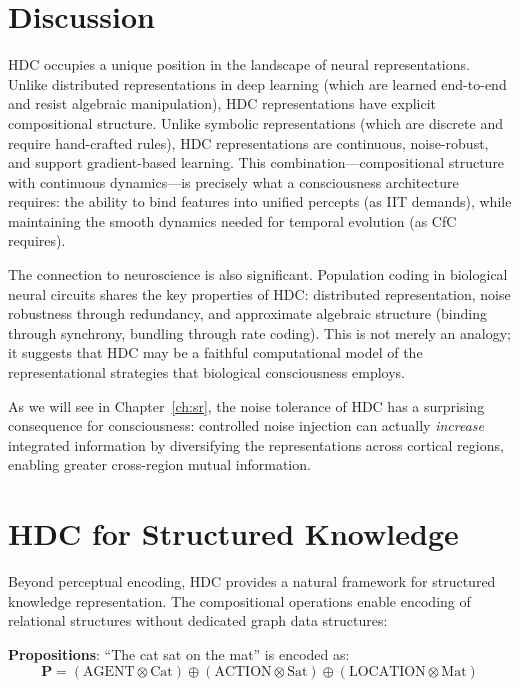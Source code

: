 \documentclass[12pt]{book}
\newcommand{\bind}{\otimes}
\newcommand{\bundle}{\oplus}
\begin{document}
\section{Discussion}

HDC occupies a unique position in the landscape of neural representations. Unlike distributed representations in deep learning (which are learned end-to-end and resist algebraic manipulation), HDC representations have explicit compositional structure. Unlike symbolic representations (which are discrete and require hand-crafted rules), HDC representations are continuous, noise-robust, and support gradient-based learning. This combination---compositional structure with continuous dynamics---is precisely what a consciousness architecture requires: the ability to bind features into unified percepts (as IIT demands), while maintaining the smooth dynamics needed for temporal evolution (as CfC requires).

The connection to neuroscience is also significant. Population coding in biological neural circuits shares the key properties of HDC: distributed representation, noise robustness through redundancy, and approximate algebraic structure (binding through synchrony, bundling through rate coding). This is not merely an analogy; it suggests that HDC may be a faithful computational model of the representational strategies that biological consciousness employs.

As we will see in Chapter~\ref{ch:sr}, the noise tolerance of HDC has a surprising consequence for consciousness: controlled noise injection can actually \textit{increase} integrated information by diversifying the representations across cortical regions, enabling greater cross-region mutual information.

\section{HDC for Structured Knowledge}

Beyond perceptual encoding, HDC provides a natural framework for structured knowledge representation. The compositional operations enable encoding of relational structures without dedicated graph data structures:

\textbf{Propositions}: ``The cat sat on the mat'' is encoded as:
\begin{equation}
\mathbf{P} = (\text{AGENT} \bind \text{Cat}) \bundle (\text{ACTION} \bind \text{Sat}) \bundle (\text{LOCATION} \bind \text{Mat})
\end{equation}
\end{document}

